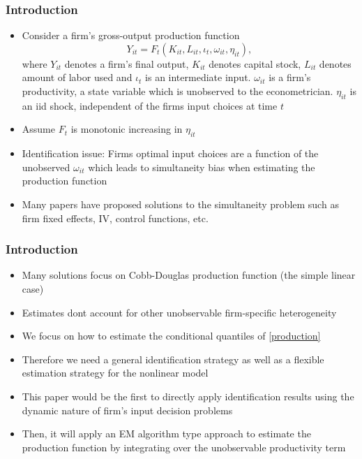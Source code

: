 \documentclass{beamer}
\begin{document}
\begin{frame}
\frametitle{Introduction}
\begin{itemize} 
\item Consider a firm's gross-output production function
\begin{equation} \label{production}
Y_{it}=F_{t}(K_{it}, L_{it}, \iota_{t}, \omega_{it}, \eta_{it}),
\end{equation}
where $Y_{it}$ denotes a firm's final output, $K_{it}$ denotes capital stock, $L_{it}$ denotes amount of labor used and $\iota_{t}$ is an intermediate input. $\omega_{it}$ is a firm's productivity, a state variable which is unobserved to the econometrician. $\eta_{it}$ is an iid shock, independent of the firms input choices at time $t$
\item Assume $F_{t}$ is monotonic increasing in $\eta_{it}$
\item Identification issue: Firms optimal input choices are a function of the unobserved $\omega_{it}$ which leads to simultaneity bias when estimating the production function
\item Many papers have proposed solutions to the simultaneity problem such as firm fixed effects, IV, control functions, etc.
\end{itemize}
\end{frame}
\begin{frame}
\frametitle{Introduction}
\begin{itemize}
\item Many solutions focus on Cobb-Douglas production function (the simple linear case)
\item Estimates dont account for other unobservable firm-specific heterogeneity
\item We focus on how to estimate the conditional quantiles of \eqref{production}
\item Therefore we need a general identification strategy as well as a flexible estimation strategy for the nonlinear model
\item This paper would be the first to directly apply identification results using the dynamic nature of firm's input decision problems
\item Then, it will apply an EM algorithm type approach to estimate the production function by integrating over the unobservable productivity term
\end{itemize}
\end{frame}
\end{document}
